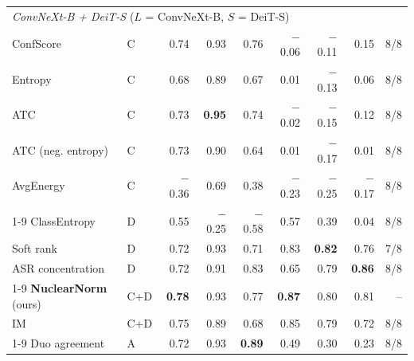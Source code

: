 \begin{table}[t]
\begin{tabular}{ll rrr rrr r}
\midrule
\multicolumn{9}{l}{\textit{ConvNeXt-B + DeiT-S} \quad ($L$ = ConvNeXt-B, $S$ = DeiT-S)} \\
ConfScore & C & \phantom{-}0.74 & \phantom{-}0.93 & \phantom{-}0.76 & $-$0.06 & $-$0.11 & \phantom{-}0.15 & 8/8 \\
Entropy & C & \phantom{-}0.68 & \phantom{-}0.89 & \phantom{-}0.67 & \phantom{-}0.01 & $-$0.13 & \phantom{-}0.06 & 8/8 \\
ATC & C & \phantom{-}0.73 & \textbf{\phantom{-}0.95} & \phantom{-}0.74 & $-$0.02 & $-$0.15 & \phantom{-}0.12 & 8/8 \\
ATC (neg. entropy) & C & \phantom{-}0.73 & \phantom{-}0.90 & \phantom{-}0.64 & \phantom{-}0.01 & $-$0.17 & \phantom{-}0.01 & 8/8 \\
AvgEnergy & C & $-$0.36 & \phantom{-}0.69 & \phantom{-}0.38 & $-$0.23 & $-$0.25 & $-$0.17 & 8/8 \\
\cmidrule(l){1-9}
ClassEntropy & D & \phantom{-}0.55 & $-$0.25 & $-$0.58 & \phantom{-}0.57 & \phantom{-}0.39 & \phantom{-}0.04 & 8/8 \\
Soft rank & D & \phantom{-}0.72 & \phantom{-}0.93 & \phantom{-}0.71 & \phantom{-}0.83 & \textbf{\phantom{-}0.82} & \phantom{-}0.76 & 7/8 \\
ASR concentration & D & \phantom{-}0.72 & \phantom{-}0.91 & \phantom{-}0.83 & \phantom{-}0.65 & \phantom{-}0.79 & \textbf{\phantom{-}0.86} & 8/8 \\
\cmidrule(l){1-9}
\textbf{NuclearNorm} (ours) & C+D & \textbf{\phantom{-}0.78} & \phantom{-}0.93 & \phantom{-}0.77 & \textbf{\phantom{-}0.87} & \phantom{-}0.80 & \phantom{-}0.81 & -- \\
IM & C+D & \phantom{-}0.75 & \phantom{-}0.89 & \phantom{-}0.68 & \phantom{-}0.85 & \phantom{-}0.79 & \phantom{-}0.72 & 8/8 \\
\cmidrule(l){1-9}
Duo agreement & A & \phantom{-}0.72 & \phantom{-}0.93 & \textbf{\phantom{-}0.89} & \phantom{-}0.49 & \phantom{-}0.30 & \phantom{-}0.23 & 8/8 \\
\bottomrule
\end{tabular}
\end{table}
